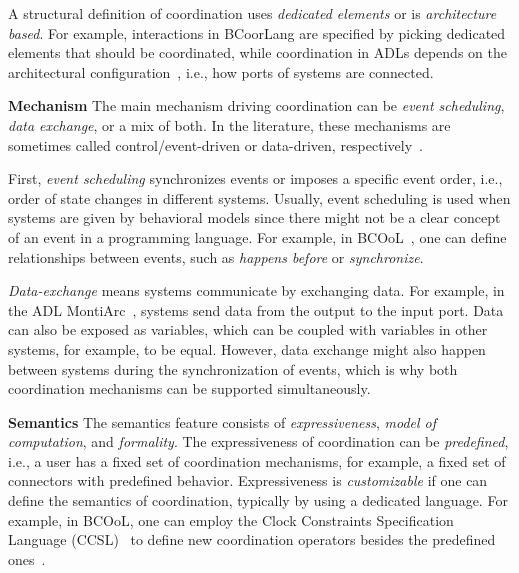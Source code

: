 \documentclass[runningheads]{llncs}
\newcommand{\feature}[1]{\textbf{#1}}
\begin{document}
A structural definition of coordination uses \textit{dedicated elements} or is \textit{architecture based}.
For example, interactions in BCoorLang are specified by picking dedicated elements that should be coordinated, while coordination in ADLs depends on the architectural configuration~\cite{medvidovicClassificationComparisonFramework2000}, i.e., how ports of systems are connected.

\feature{Mechanism} The main mechanism driving coordination can be \textit{event scheduling}, \textit{data exchange}, or a mix of both.
In the literature, these mechanisms are sometimes called control/event-driven or data-driven, respectively~\cite{papadopoulosCoordinationModelsLanguages1998,varalarsenBCOolBehavioralCoordination2016}.

First, \textit{event scheduling} synchronizes events or imposes a specific event order, i.e., order of state changes in different systems.
Usually, event scheduling is used when systems are given by behavioral models since there might not be a clear concept of an event in a programming language.
For example, in BCOoL~\cite{varalarsenBehavioralCoordinationOperator2015}, one can define relationships between events, such as \textit{happens before} or \textit{synchronize}.

\textit{Data-exchange} means systems communicate by exchanging data.
For example, in the ADL MontiArc~\cite{haberMontiArcArchitecturalModeling2014}, systems send data from the output to the input port.
Data can also be exposed as variables, which can be coupled with variables in other systems, for example, to be equal.
However, data exchange might also happen between systems during the synchronization of events, which is why both coordination mechanisms can be supported simultaneously.

\feature{Semantics} The semantics feature consists of \textit{expressiveness}, \textit{model of computation}, and \textit{formality}.
The expressiveness of coordination can be \textit{predefined}, i.e., a user has a fixed set of coordination mechanisms, for example, a fixed set of connectors with predefined behavior.
Expressiveness is \textit{customizable} if one can define the semantics of coordination, typically by using a dedicated language.
For example, in BCOoL, one can employ the Clock Constraints Specification Language (CCSL)~\cite{andreSyntaxSemanticsClock2009} to define new coordination operators besides the predefined ones~\cite{varalarsenBCOolBehavioralCoordination2016,varalarsenBehavioralCoordinationOperator2015}.
\end{document}
